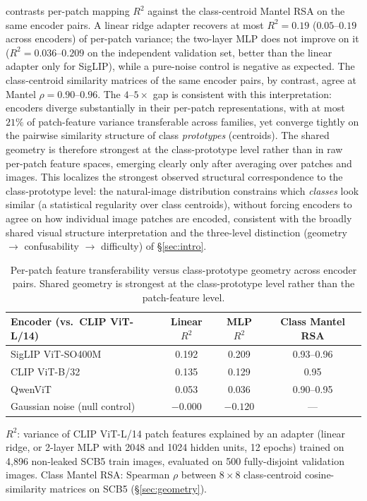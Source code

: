 \documentclass[a4paper,fleqn]{cas-sc}
\begin{document}
 contrasts per-patch mapping $R^2$ against the class-centroid Mantel RSA on the same encoder pairs. A linear ridge adapter recovers at most $R^2 = 0.19$ ($0.05$--$0.19$ across encoders) of per-patch variance; the two-layer MLP does not improve on it ($R^2 = 0.036$--$0.209$ on the independent validation set, better than the linear adapter only for SigLIP), while a pure-noise control is negative as expected. The class-centroid similarity matrices of the same encoder pairs, by contrast, agree at Mantel $\rho = 0.90$--$0.96$. The $4$--$5\times$ gap is consistent with this interpretation: encoders diverge substantially in their per-patch representations, with at most $21\%$ of patch-feature variance transferable across families, yet converge tightly on the pairwise similarity structure of class \emph{prototypes} (centroids). The shared geometry is therefore strongest at the class-prototype level rather than in raw per-patch feature spaces, emerging clearly only after averaging over patches and images. This localizes the strongest observed structural correspondence to the class-prototype level: the natural-image distribution constrains which \emph{classes} look similar (a statistical regularity over class centroids), without forcing encoders to agree on how individual image patches are encoded, consistent with the broadly shared visual structure interpretation and the three-level distinction (geometry $\to$ confusability $\to$ difficulty) of \S\ref{sec:intro}.

\begin{table}[h]
\centering
\caption{Per-patch feature transferability versus class-prototype geometry across encoder pairs. Shared geometry is strongest at the class-prototype level rather than the patch-feature level.}
\label{tab:patchlevel}
\small
\begin{tabular}{lccc}
\toprule
Encoder (vs.\ CLIP ViT-L/14) & Linear $R^2$ & MLP $R^2$ & Class Mantel RSA \\
\midrule
SigLIP ViT-SO400M & 0.192 & 0.209 & 0.93--0.96 \\
CLIP ViT-B/32 & 0.135 & 0.129 & 0.95 \\
QwenViT & 0.053 & 0.036 & 0.90--0.95 \\
\midrule
Gaussian noise (null control) & $-0.000$ & $-0.120$ & --- \\
\bottomrule
\end{tabular}

\vspace{2pt}
{\footnotesize $R^2$: variance of CLIP ViT-L/14 patch features explained by an adapter (linear ridge, or 2-layer MLP with 2048 and 1024 hidden units, 12 epochs) trained on 4{,}896 non-leaked SCB5 train images, evaluated on 500 fully-disjoint validation images. Class Mantel RSA: Spearman $\rho$ between $8\times8$ class-centroid cosine-similarity matrices on SCB5 (\S\ref{sec:geometry}).}
\end{table}
\end{document}
